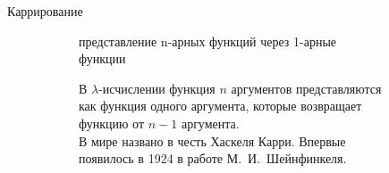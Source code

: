 \begin{frame}{Каррирование}
\begin{figure}[t]
  \begin{subfigure}[t]{0.4 \textwidth}
        \vspace{-10em}
\begin{definition}[Каррирование]
представление n-арных функций через 1-арные функции
\end{definition}

\vspace{1em}

В $\lambda$-исчислении функция $n$ аргументов представляются как функция одного аргумента, которые возвращает функцию от $n-1$ аргумента.\\

В мире названо в честь Хаскеля Карри. Впервые появилось в 1924 в работе М.~И.~Шейнфинкеля.\\



\end{subfigure}
\end{figure}
\end{frame}
